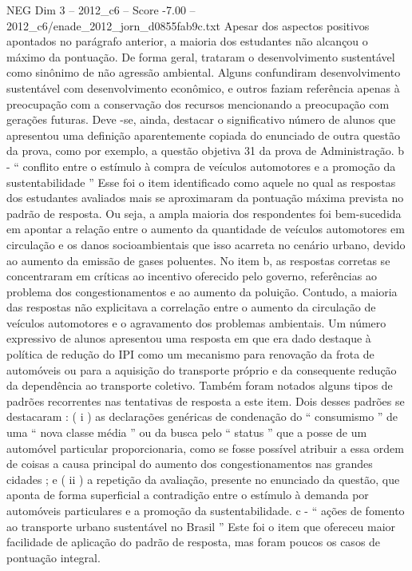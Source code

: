 \begin{textsample}{NEG Dim 3 – 2012\_c6 – Score -7.00 – 2012\_c6/enade\_2012\_jorn\_d0855fab9c.txt}
Apesar dos aspectos positivos apontados no parágrafo anterior, a maioria dos estudantes não alcançou o máximo da pontuação.
De forma geral, trataram o desenvolvimento sustentável como sinônimo de não agressão ambiental.
Alguns confundiram desenvolvimento sustentável com desenvolvimento econômico, e outros faziam referência apenas à preocupação com a conservação dos recursos mencionando a preocupação com gerações futuras.
Deve -se, ainda, destacar o significativo número de alunos que apresentou uma definição aparentemente copiada do enunciado de outra questão da prova, como por exemplo, a questão objetiva 31 da prova de Administração. b - “ conflito entre o estímulo à compra de veículos automotores e a promoção da sustentabilidade ” Esse foi o item identificado como aquele no qual as respostas dos estudantes avaliados mais se aproximaram da pontuação máxima prevista no padrão de resposta.
Ou seja, a ampla maioria dos respondentes foi bem-sucedida em apontar a relação entre o aumento da quantidade de veículos automotores em circulação e os danos socioambientais que isso acarreta no cenário urbano, devido ao aumento da emissão de gases poluentes.
No item b, as respostas corretas se concentraram em críticas ao incentivo oferecido pelo governo, referências ao problema dos congestionamentos e ao aumento da poluição.
Contudo, a maioria das respostas não explicitava a correlação entre o aumento da circulação de veículos automotores e o agravamento dos problemas ambientais.
Um número expressivo de alunos apresentou uma resposta em que era dado destaque à política de redução do IPI como um mecanismo para renovação da frota de automóveis ou para a aquisição do transporte próprio e da consequente redução da dependência ao transporte coletivo.
Também foram notados alguns tipos de padrões recorrentes nas tentativas de resposta a este item.
Dois desses padrões se destacaram : ( i ) as declarações genéricas de condenação do “ consumismo ” de uma “ nova classe média ” ou da busca pelo “ status ” que a posse de um automóvel particular proporcionaria, como se fosse possível atribuir a essa ordem de coisas a causa principal do aumento dos congestionamentos nas grandes cidades ; e ( ii ) a repetição da avaliação, presente no enunciado da questão, que aponta de forma superficial a contradição entre o estímulo à demanda por automóveis particulares e a promoção da sustentabilidade. c - “ ações de fomento ao transporte urbano sustentável no Brasil ” Este foi o item que ofereceu maior facilidade de aplicação do padrão de resposta, mas foram poucos os casos de pontuação integral.

\end{textsample}

